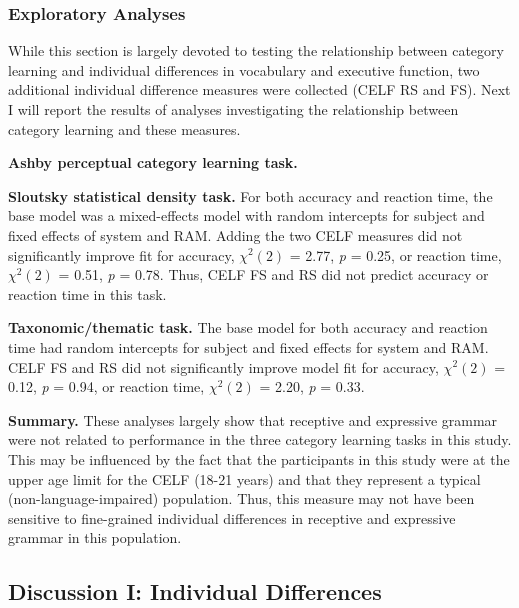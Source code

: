 \documentclass[../dissertation.tex]{subfiles}
\begin{document}
\subsubsection{Exploratory Analyses}

While this section is largely devoted to testing the relationship between category learning and individual differences in vocabulary and executive function, two additional individual difference measures were collected (CELF RS and FS). Next I will report the results of analyses investigating the relationship between category learning and these measures. \par
\textbf{Ashby perceptual category learning task.} \par
\textbf{Sloutsky statistical density task.} For both accuracy and reaction time, the base model was a mixed-effects model with random intercepts for subject and fixed effects of system and RAM. Adding the two CELF measures did not significantly improve fit for accuracy, $\chi^{2}(2)$ = 2.77, \textit{p} = 0.25, or reaction time, $\chi^{2}(2)$ = 0.51, \textit{p} = 0.78. Thus, CELF FS and RS did not predict accuracy or reaction time in this task. \par
\textbf{Taxonomic/thematic task.} The base model for both accuracy and reaction time had random intercepts for subject and fixed effects for system and RAM. CELF FS and RS did not significantly improve model fit for accuracy, $\chi^{2}(2)$ = 0.12, \textit{p} = 0.94, or reaction time, $\chi^{2}(2)$ = 2.20, \textit{p} = 0.33. \par
\textbf{Summary.} These analyses largely show that receptive and expressive grammar were not related to performance in the three category learning tasks in this study. This may be influenced by the fact that the participants in this study were at the upper age limit for the CELF (18-21 years) and that they represent a typical (non-language-impaired) population. Thus, this measure may not have been sensitive to fine-grained individual differences in receptive and expressive grammar in this population.

\subsection{Discussion I: Individual Differences}
\end{document}
